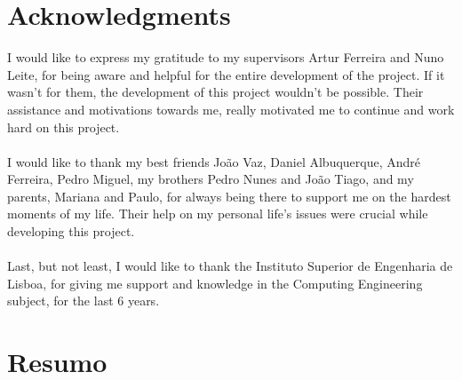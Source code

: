 \chapter*{Acknowledgments}

I would like to express my gratitude to my supervisors Artur Ferreira and Nuno Leite, for being aware and helpful for the entire development of the project. If it wasn't for them, the development of this project wouldn't be possible. Their assistance and motivations towards me, really motivated me to continue and work hard on this project.\\
\\
I would like to thank my best friends João Vaz, Daniel Albuquerque, André Ferreira, Pedro Miguel, my brothers Pedro Nunes and João Tiago, and my parents, Mariana and Paulo, for always being there to support me on the hardest moments of my life. Their help on my personal life's issues were crucial while developing this project.\\
\\
Last, but not least, I would like to thank the Instituto Superior de Engenharia de Lisboa, for giving me support and knowledge in the Computing Engineering subject, for the last 6 years.
\
\chapter*{Resumo}

